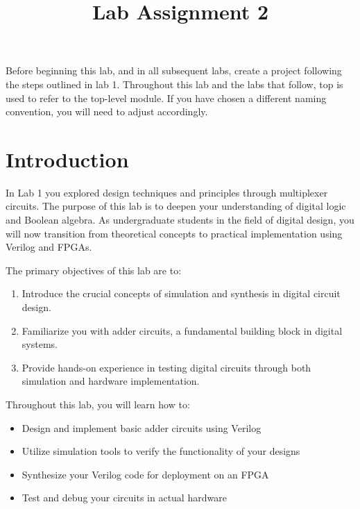 \documentclass[12pt]{betterjournal}
\title{Lab Assignment 2 }
\author{}
\date{}
\newcommand{\keyword}[1]{{\usefont{OT1}{lmtt}{b}{n}#1}}
\begin{document}
\captionsetup{tablewithin=section}
\maketitle
\begin{important}[frametitle={Create a project}]
Before beginning this lab, and in all subsequent labs, create a project following the steps outlined in lab 1. Throughout this lab and the labs that follow, \keyword{top} is used to refer to the top-level module. If you have chosen a different naming convention, you will need to adjust accordingly.
\end{important}

\section{Introduction}

In Lab 1 you explored design techniques and principles through multiplexer circuits. The purpose of this lab is to deepen your understanding of digital logic and Boolean algebra. As undergraduate students in the field of digital design, you will now transition from theoretical concepts to practical implementation using Verilog and FPGAs.

The primary objectives of this lab are to:
\begin{enumerate}
    \item Introduce the crucial concepts of simulation and synthesis in digital circuit design.
    \item Familiarize you with adder circuits, a fundamental building block in digital systems.
    \item Provide hands-on experience in testing digital circuits through both simulation and hardware implementation.
\end{enumerate}



Throughout this lab, you will learn how to:

\begin{itemize}
\item Design and implement basic adder circuits using Verilog
\item Utilize simulation tools to verify the functionality of your designs
\item Synthesize your Verilog code for deployment on an FPGA
\item Test and debug your circuits in actual hardware
\end{itemize}
\end{document}
